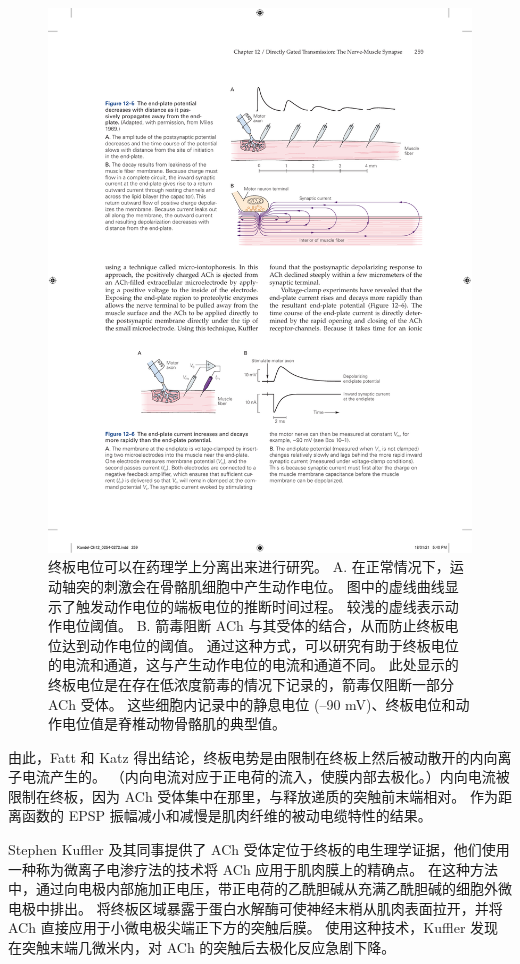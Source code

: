 \begin{figure}[htbp]
	\centering
	\includegraphics[width=0.8\linewidth]{chap12/fig_12_4}
	\caption{终板电位可以在药理学上分离出来进行研究。 A. 在正常情况下，运动轴突的刺激会在骨骼肌细胞中产生动作电位。 图中的虚线曲线显示了触发动作电位的端板电位的推断时间过程。 较浅的虚线表示动作电位阈值。 B. 箭毒阻断 ACh 与其受体的结合，从而防止终板电位达到动作电位的阈值。 通过这种方式，可以研究有助于终板电位的电流和通道，这与产生动作电位的电流和通道不同。 此处显示的终板电位是在存在低浓度箭毒的情况下记录的，箭毒仅阻断一部分 ACh 受体。 这些细胞内记录中的静息电位 (–90 mV)、终板电位和动作电位值是脊椎动物骨骼肌的典型值。}
	\label{fig:12_4}
\end{figure}


由此，Fatt 和 Katz 得出结论，终板电势是由限制在终板上然后被动散开的内向离子电流产生的。
（内向电流对应于正电荷的流入，使膜内部去极化。）内向电流被限制在终板，因为 ACh 受体集中在那里，与释放递质的突触前末端相对。
作为距离函数的 EPSP 振幅减小和减慢是肌肉纤维的被动电缆特性的结果。


Stephen Kuffler 及其同事提供了 ACh 受体定位于终板的电生理学证据，他们使用一种称为微离子电渗疗法的技术将 ACh 应用于肌肉膜上的精确点。
在这种方法中，通过向电极内部施加正电压，带正电荷的乙酰胆碱从充满乙酰胆碱的细胞外微电极中排出。
将终板区域暴露于蛋白水解酶可使神经末梢从肌肉表面拉开，并将 ACh 直接应用于小微电极尖端正下方的突触后膜。
使用这种技术，Kuffler 发现在突触末端几微米内，对 ACh 的突触后去极化反应急剧下降。


